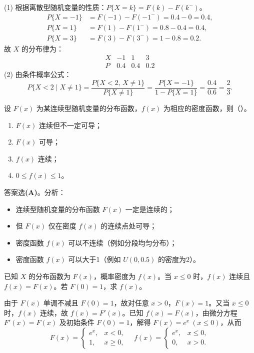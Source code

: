 \documentclass[lang=cn,11pt]{elegantbook}
\begin{document}
\begin{solution}
(1) 根据离散型随机变量的性质：$P\{X=k\} = F(k) - F(k^-)$。
\begin{align*}
P\{X=-1\} &= F(-1) - F(-1^-) = 0.4 - 0 = 0.4, \\
P\{X=1\} &= F(1) - F(1^-) = 0.8 - 0.4 = 0.4, \\
P\{X=3\} &= F(3) - F(3^-) = 1 - 0.8 = 0.2.
\end{align*}
故 $X$ 的分布律为：
\[
\begin{array}{c|ccc}
X & -1 & 1 & 3 \\
\hline
P & 0.4 & 0.4 & 0.2
\end{array}
\]
(2) 由条件概率公式：
\[
P\{X<2 \mid X \neq 1\} = \frac{P\{X<2,\, X \neq 1\}}{P\{X \neq 1\}} = \frac{P\{X=-1\}}{1-P\{X=1\}} = \frac{0.4}{0.6} = \frac{2}{3}.
\]
\end{solution}

\begin{exercise}[连续型分布函数性质] 
设 $F(x)$ 为某连续型随机变量的分布函数，$f(x)$ 为相应的密度函数，则（\quad）。
\begin{enumerate}
    \item[(A)] $F(x)$ 连续但不一定可导；
    \item[(B)] $F(x)$ 可导；
    \item[(C)] $f(x)$ 连续；
    \item[(D)] $0\leqslant f(x)\leqslant1$。
\end{enumerate}
\end{exercise}
\begin{solution}
答案选\textbf{(A)}。分析：
\begin{itemize}
    \item 连续型随机变量的分布函数 $F(x)$ 一定是连续的；
    \item 但 $F(x)$ 仅在密度 $f(x)$ 的连续点处可导；
    \item 密度函数 $f(x)$ 可以不连续（例如分段均匀分布）；
    \item 密度函数 $f(x)$ 可以大于1（例如 $U(0,0.5)$ 的密度为2）。
\end{itemize}
\end{solution}


\begin{exercise}\label{exer:2-6}
已知 $X$ 的分布函数为 $F(x)$，概率密度为 $f(x)$。当 $x \le 0$ 时，$f(x)$ 连续且 $f(x) = F(x)$。若 $F(0) = 1$，求 $f(x)$。
\end{exercise}

\begin{solution}
由于 $F(x)$ 单调不减且 $F(0) = 1$，故对任意 $x > 0$，$F(x) = 1$。又当 $x \le 0$ 时，$f(x)$ 连续，故 $f(x) = F'(x)$。已知 $f(x) = F(x)$，由微分方程 $F'(x) = F(x)$ 及初始条件 $F(0) = 1$，解得 $F(x) = e^x\ (x \le 0)$，从而
\[
F(x) = \begin{cases} e^x, & x < 0, \\ 1, & x \ge 0, \end{cases} \quad f(x) = \begin{cases} e^x, & x \le 0, \\ 0, & x > 0. \end{cases}
\]
\end{solution}
\end{document}

